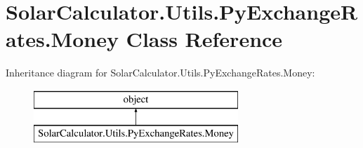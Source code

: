 \hypertarget{class_solar_calculator_1_1_utils_1_1_py_exchange_rates_1_1_money}{\section{Solar\-Calculator.\-Utils.\-Py\-Exchange\-Rates.\-Money Class Reference}
\label{class_solar_calculator_1_1_utils_1_1_py_exchange_rates_1_1_money}
}
Inheritance diagram for Solar\-Calculator.\-Utils.\-Py\-Exchange\-Rates.\-Money\-:\begin{figure}[H]
\begin{center}
\leavevmode
\includegraphics[height=2.000000cm]{class_solar_calculator_1_1_utils_1_1_py_exchange_rates_1_1_money}
\end{center}
\end{figure}
